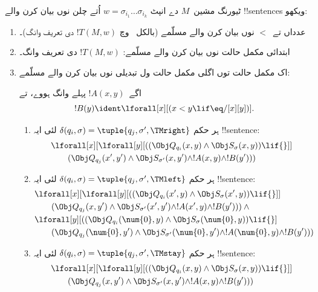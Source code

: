 \documentclass[../../../include/open-logic-section]{subfiles}
\begin{document}
ٹیورنگ مشین~$M$ دے انپٹ
$w = \sigma_{i_1}\dots\sigma_{i_k}$ اُتے
چلن نوں بیان کرن والے !!{sentence}s ویکھو:
\begin{enumerate}
\item عدداں تے~$<$ نوں بیان کرن والے
مسلّمے (بالکل~ وچ
$!T(M,w)$ دی تعریف وانگ)۔
\item ابتدائی مکمل حالت نوں بیان کرن والے
مسلّمے: $!T(M,w)$ دی تعریف وانگ۔
\item اک مکمل حالت توں اگلی مکمل حالت
ول تبدیلی نوں بیان کرن والے مسلّمے:

اگے~$!A(x, y)$ پہلے وانگ ہووے، تے
\[
  !B(y) \ident \lforall[x][(x < y \lif \eq/[x][y])].
\]
\begin{enumerate}
\item {} ہر حکم
$\delta(q_i, \sigma) =
  \tuple{q_j, \sigma', \TMright}$
لئی ایہ !!{sentence}:
\begin{align*}
& \lforall[x][\lforall[y][(
   (\Obj Q_{q_i}(x, y) \land \Obj S_{\sigma}(x, y)) \lif {}]] \\
&\qquad   (\Obj Q_{q_j}(x', y') \land \Obj S_{\sigma'}(x, y') \land
!A(x, y) \land !B(y')))
\end{align*}
\item {} ہر حکم
$\delta(q_i, \sigma) =
  \tuple{q_j, \sigma', \TMleft}$
لئی ایہ !!{sentence}:
\begin{align*}
& \lforall[x][\lforall[y][
    ((\Obj Q_{q_i}(x', y) \land \Obj S_{\sigma}(x', y)) \lif {}]]\\
& \qquad   (\Obj Q_{q_j}(x, y') \land \Obj S_{\sigma'}(x', y') \land
!A(x', y) \land !B(y'))) \land {}\\
& \lforall[y][((\Obj Q_{q_i}(\num{0}, y) \land \Obj S_{\sigma}(\num{0},
    y)) \lif {}]\\
& \qquad (\Obj Q_{q_j}(\num{0}, y') \land \Obj S_{\sigma'}(\num{0},
  y') \land !A(\num{0}, y) \land !B(y')))
\end{align*}
\item {} ہر حکم
$\delta(q_i, \sigma) =
  \tuple{q_j, \sigma', \TMstay}$
لئی ایہ !!{sentence}:
\begin{align*}
& \lforall[x][\lforall[y][(
   (\Obj Q_{q_i}(x, y) \land \Obj S_{\sigma}(x, y)) \lif {}]] \\
&\qquad (\Obj Q_{q_j}(x, y') \land \Obj S_{\sigma'}(x, y') \land
!A(x, y) \land !B(y')))
\end{align*}
\end{enumerate}

\end{enumerate}
\end{document}
